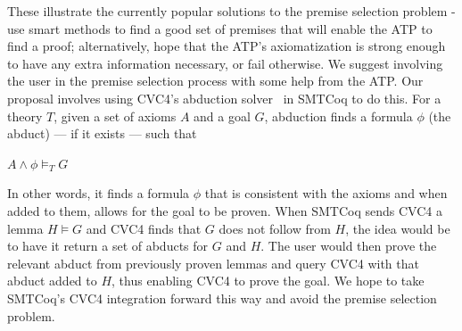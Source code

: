 \documentclass{article}
\begin{document}
	These illustrate the currently popular solutions 
	to the premise selection problem - use smart 
	methods to find a good set of premises that will 
	enable the ATP to find a proof; alternatively, 
	hope that the ATP's	axiomatization is strong enough 
	to have any	extra information necessary, or fail 
	otherwise. We suggest involving the user in the 
	premise selection process with some help from the 
	ATP. Our proposal involves using CVC4's abduction
	solver~\cite{DBLP:conf/cade/ReynoldsBLT20} in 
	SMTCoq to do this. For a theory $T$, given a
	set of axioms $A$ and a goal $G$, abduction 
	finds a formula $\phi$ (the abduct) --- if it 
	exists --- such that 
	\begin{center}
		$A \land \phi \models_{T} G$
	\end{center}
	In other words, it finds a formula $\phi$ that 
	is consistent with the axioms and when added 
	to them, allows for the goal to be proven. 
	When SMTCoq sends CVC4 a lemma $H \models G$
	and CVC4 finds that $G$ does not follow from $H$, 
	the idea would be to have it 
	return a set of abducts for $G$ and $H$. The user 
	would then prove the relevant abduct from 
	previously proven lemmas and query CVC4 
	with that abduct added to $H$, thus enabling 
	CVC4 to prove the goal. We hope to take SMTCoq's 
	CVC4 integration forward this way and avoid the 
	premise selection problem.


\end{document}
